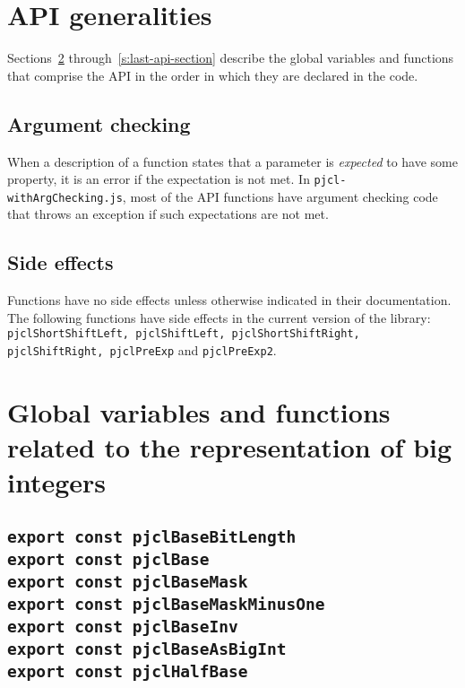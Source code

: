 \documentclass[12pt]{article}
\begin{document}
\section{API generalities}
\label{s:api}

Sections~\ref{s:first-api-section} through~\ref{s:last-api-section} 
describe the global variables and functions that
comprise the API in the order in which they are declared in the code.

\subsection{Argument checking}

When a description of a function states that a parameter is {\em
  expected\/} to have some property, it is an error if the expectation
is not met.  In {\tt pjcl-withArgChecking.js}, most of the API functions
have argument checking code that throws an exception if such
expectations are not met.

\subsection{Side effects}

Functions have no side effects unless otherwise indicated in their documentation. The following functions have side effects in the current version of the library: {\tt pjclShortShiftLeft, pjclShiftLeft, pjclShortShiftRight, pjclShiftRight, pjclPreExp} and {\tt pjclPreExp2}.

\section{Global variables and functions related to the representation of big integers}
\label{s:first-api-section}

\subsection{\tt export const pjclBaseBitLength\\export const pjclBase\\export const pjclBaseMask\\export const pjclBaseMaskMinusOne\\export const pjclBaseInv\\export const pjclBaseAsBigInt\\export const pjclHalfBase}
\label{s:global-constants}
\end{document}
